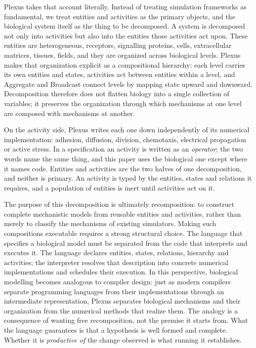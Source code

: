 \documentclass[11pt]{article}
\begin{document}
Plexus takes that account literally. Instead of treating simulation frameworks as
fundamental, we treat entities and activities as the primary objects, and the
biological system itself as the thing to be decomposed. A system is decomposed not only
into activities but also into the entities those activities act upon. These entities
are heterogeneous, receptors, signalling proteins, cells, extracellular matrices,
tissues, fields, and they are organized across biological levels. Plexus makes that
organization explicit as a compositional hierarchy: each level carries its own
entities and states, activities act between entities within a level, and Aggregate and
Broadcast connect levels by mapping state upward and downward. Decomposition therefore
does not flatten biology into a single collection of variables; it preserves the
organization through which mechanisms at one level are composed with mechanisms at
another.

On the activity side, Plexus writes each one down independently of its numerical
implementation: adhesion, diffusion, division, chemotaxis, electrical propagation or
active stress. In a specification an activity is written as an \emph{operator}; the two
words name the same thing, and this paper uses the biological one except where it
names code. Entities and activities are the two halves of one decomposition, and
neither is primary. An activity is typed by the entities, states and relations it
requires, and a population of entities is inert until activities act on it.

The purpose of this decomposition is ultimately recomposition: to construct complete
mechanistic models from reusable entities and activities, rather than merely to
classify the mechanisms of existing simulators. Making such compositions executable
requires a strong structural choice. The language that specifies a biological model
must be separated from the code that interprets and executes it. The language declares
entities, states, relations, hierarchy and activities; the interpreter resolves that
description into concrete numerical implementations and schedules their execution. In
this perspective, biological modelling becomes analogous to compiler design: just as
modern compilers separate programming languages from their implementations through an
intermediate representation, Plexus separates biological mechanisms and their
organization from the numerical methods that realize them. The analogy is a consequence
of wanting free recomposition, not the premise it starts from. What the language
guarantees is that a hypothesis is well formed and complete. Whether it is
\emph{productive of} the change observed is what running it establishes.
\end{document}
